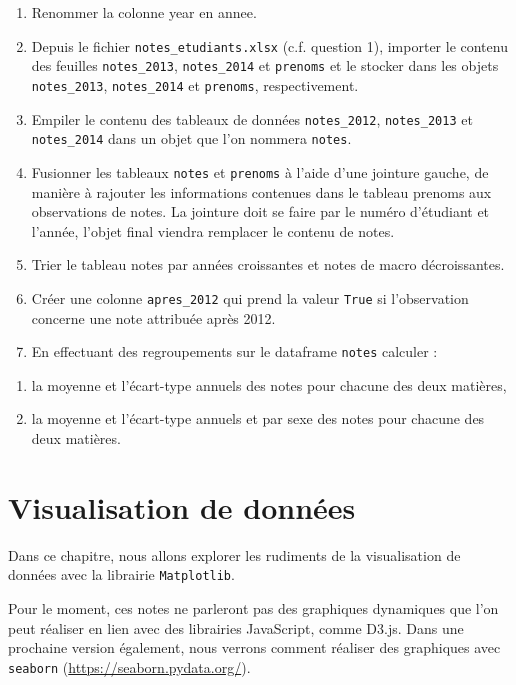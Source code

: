 \documentclass[12pt,]{book}
\providecommand{\tightlist}{%
  \setlength{\itemsep}{0pt}\setlength{\parskip}{0pt}}
\numberwithin{equation}{section}
\numberwithin{countremarque}{section}
\begin{document}
\begin{enumerate}
\def\labelenumi{\arabic{enumi}.}
\setcounter{enumi}{9}
\tightlist
\item
  Renommer la colonne year en annee.
\item
  Depuis le fichier \texttt{notes\_etudiants.xlsx} (c.f. question 1),
  importer le contenu des feuilles \texttt{notes\_2013},
  \texttt{notes\_2014} et \texttt{prenoms} et le stocker dans les objets
  \texttt{notes\_2013}, \texttt{notes\_2014} et \texttt{prenoms},
  respectivement.
\item
  Empiler le contenu des tableaux de données \texttt{notes\_2012},
  \texttt{notes\_2013} et \texttt{notes\_2014} dans un objet que l'on
  nommera \texttt{notes}.
\item
  Fusionner les tableaux \texttt{notes} et \texttt{prenoms} à l'aide
  d'une jointure gauche, de manière à rajouter les informations
  contenues dans le tableau prenoms aux observations de notes. La
  jointure doit se faire par le numéro d'étudiant et l'année, l'objet
  final viendra remplacer le contenu de notes.
\item
  Trier le tableau notes par années croissantes et notes de macro
  décroissantes.
\item
  Créer une colonne \texttt{apres\_2012} qui prend la valeur
  \texttt{True} si l'observation concerne une note attribuée après 2012.
\item
  En effectuant des regroupements sur le dataframe \texttt{notes}
  calculer :
\end{enumerate}

\begin{enumerate}
\def\labelenumi{(\alph{enumi})}
\tightlist
\item
  la moyenne et l'écart-type annuels des notes pour chacune des deux
  matières,
\item
  la moyenne et l'écart-type annuels et par sexe des notes pour chacune
  des deux matières.
\end{enumerate}

\chapter{Visualisation de données}\label{visualisation-de-donnees}

Dans ce chapitre, nous allons explorer les rudiments de la visualisation
de données avec la librairie \texttt{Matplotlib}.

Pour le moment, ces notes ne parleront pas des graphiques dynamiques que
l'on peut réaliser en lien avec des librairies JavaScript, comme D3.js.
Dans une prochaine version également, nous verrons comment réaliser des
graphiques avec \texttt{seaborn} (\url{https://seaborn.pydata.org/}).
\end{document}
